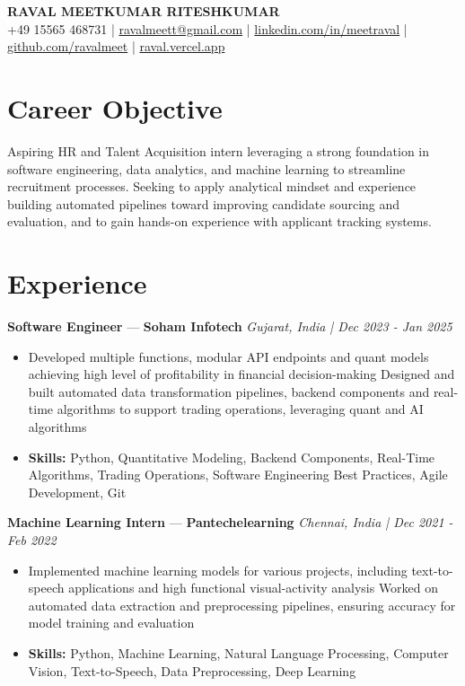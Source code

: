 \documentclass[a4paper,10pt]{article}
\begin{document}
\begin{center}
  {\Large\bfseries RAVAL MEETKUMAR RITESHKUMAR}\\[2pt]
  {\small +49 15565 468731 \;|\; \href{mailto:ravalmeett@gmail.com}{ravalmeett@gmail.com} \;|\; \href{https://www.linkedin.com/in/meetraval/}{linkedin.com/in/meetraval} \;|\; \href{https://github.com/ravalmeet}{github.com/ravalmeet} \;|\; \href{https://raval.vercel.app/}{raval.vercel.app}}
\end{center}
\vspace{-3pt}

\section*{Career Objective}
Aspiring HR and Talent Acquisition intern leveraging a strong foundation in software engineering, data analytics, and machine learning to streamline recruitment processes. Seeking to apply analytical mindset and experience building automated pipelines toward improving candidate sourcing and evaluation, and to gain hands-on experience with applicant tracking systems.\par

\section*{Experience}
\textbf{Software Engineer} — \textbf{Soham Infotech} \hfill \textit{Gujarat, India \;|\; Dec 2023 - Jan 2025}\par
\vspace{1pt}
\begin{itemize}
  \item Developed multiple functions, modular API endpoints and quant models achieving high level of profitability in financial decision-making Designed and built automated data transformation pipelines, backend components and real-time algorithms to support trading operations, leveraging quant and AI algorithms
  \item \textbf{Skills:} Python, Quantitative Modeling, Backend Components, Real-Time Algorithms, Trading Operations, Software Engineering Best Practices, Agile Development, Git
\end{itemize}
\vspace{3pt}
\textbf{Machine Learning Intern} — \textbf{Pantechelearning} \hfill \textit{Chennai, India \;|\; Dec 2021 - Feb 2022}\par
\vspace{1pt}
\begin{itemize}
  \item Implemented machine learning models for various projects, including text-to-speech applications and high functional visual-activity analysis Worked on automated data extraction and preprocessing pipelines, ensuring accuracy for model training and evaluation
  \item \textbf{Skills:} Python, Machine Learning, Natural Language Processing, Computer Vision, Text-to-Speech, Data Preprocessing, Deep Learning
\end{itemize}
\end{document}
